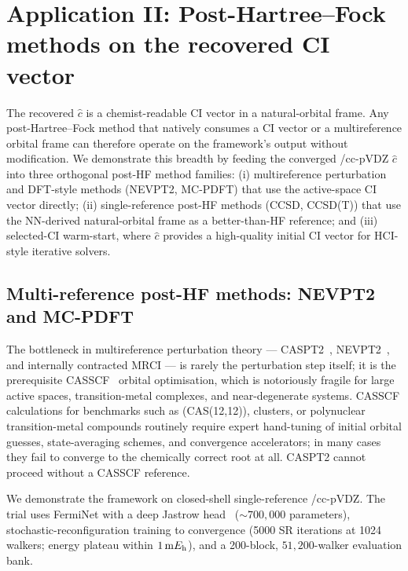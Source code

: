 \documentclass[journal=jctcce,manuscript=article,layout=traditional]{achemso}
\begin{document}
\section{Application II: Post-Hartree--Fock methods on the recovered
         CI vector}
\label{sec:caspt2_replacement}

The recovered $\widehat c$ is a chemist-readable CI vector in a
natural-orbital frame. Any post-Hartree--Fock method that natively
consumes a CI vector or a multireference orbital frame can therefore
operate on the framework's output without modification. We
demonstrate this breadth by feeding the converged
/cc-pVDZ $\widehat c$ into three orthogonal post-HF method
families: (i) multireference perturbation and DFT-style methods
(NEVPT2, MC-PDFT) that use the active-space CI vector directly;
(ii) single-reference post-HF methods (CCSD, CCSD(T)) that use the
NN-derived natural-orbital frame as a better-than-HF reference;
and (iii) selected-CI warm-start, where $\widehat c$ provides a
high-quality initial CI vector for HCI-style iterative solvers.

\subsection{Multi-reference post-HF methods: NEVPT2 and MC-PDFT}
\label{sec:caspt2_replacement_mr}

The bottleneck in multireference perturbation theory ---
CASPT2~\cite{Andersson1992CASPT2}, NEVPT2~\cite{Angeli2001NEVPT2}, and
internally contracted MRCI --- is rarely the perturbation step
itself; it is the prerequisite CASSCF~\cite{Roos1980SACASSCF} orbital
optimisation, which is notoriously fragile for large active spaces,
transition-metal complexes, and near-degenerate systems. CASSCF
calculations for benchmarks such as  (CAS(12,12)),
\ce{[Fe2S2]} clusters, or polynuclear transition-metal compounds
routinely require expert hand-tuning of initial orbital guesses,
state-averaging schemes, and convergence accelerators; in many cases
they fail to converge to the chemically correct root at all.
CASPT2 cannot proceed without a CASSCF reference.

We demonstrate the framework on closed-shell single-reference
/cc-pVDZ. The trial uses FermiNet with a deep Jastrow
head~\cite{Hermann2020PauliNet} ($\sim 700{,}000$ parameters),
stochastic-reconfiguration training to convergence (5000 SR
iterations at 1024 walkers; energy plateau within $1\,{\rm m}E_{\rm
h}$), and a 200-block, $51{,}200$-walker evaluation bank.
\end{document}
